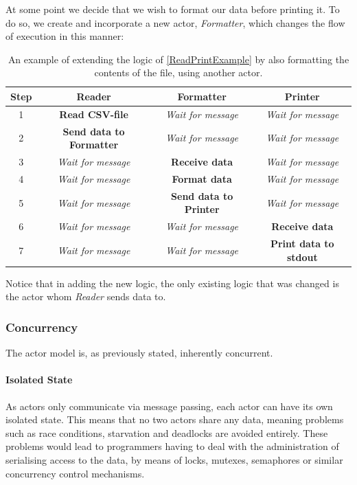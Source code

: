 At some point we decide that we wish to format our data before printing it. To do so, we create and incorporate a new actor, \emph{Formatter}, which changes the flow of execution in this manner:\\

\begin{table}[htbp]
\centering
\begin{tabular}{ | c | c | c | c | }
\hline
Step & Reader & Formatter & Printer \\\hline
1 & \textbf{Read CSV-file} & \textit{Wait for message} & \textit{Wait for message} \\\hline
2 & \textbf{Send data to Formatter} & \textit{Wait for message} & \textit{Wait for message}\\\hline
3 & \textit{Wait for message} & \textbf{Receive data} & \textit{Wait for message} \\\hline
4 & \textit{Wait for message} & \textbf{Format data} & \textit{Wait for message} \\\hline
5 & \textit{Wait for message} & \textbf{Send data to Printer} & \textit{Wait for message} \\\hline
6 & \textit{Wait for message} & \textit{Wait for message} & \textbf{Receive data}\\\hline
7 & \textit{Wait for message} & \textit{Wait for message} & \textbf{Print data to stdout} \\\hline
\end{tabular}
\caption{An example of extending the logic of \cref{ReadPrintExample} by also formatting the contents of the file, using another actor.}
\end{table}

Notice that in adding the new logic, the only existing logic that was changed is the actor whom \emph{Reader} sends data to.

\subsubsection{Concurrency}
The actor model is, as previously stated, inherently concurrent.

\paragraph{Isolated State}
As actors only communicate via message passing, each actor can have its own isolated state. This means that no two actors share any data, meaning problems such as race conditions, starvation and deadlocks are avoided entirely. These problems would lead to programmers having to deal with the administration of serialising access to the data, by means of locks, mutexes, semaphores or similar concurrency control mechanisms.

